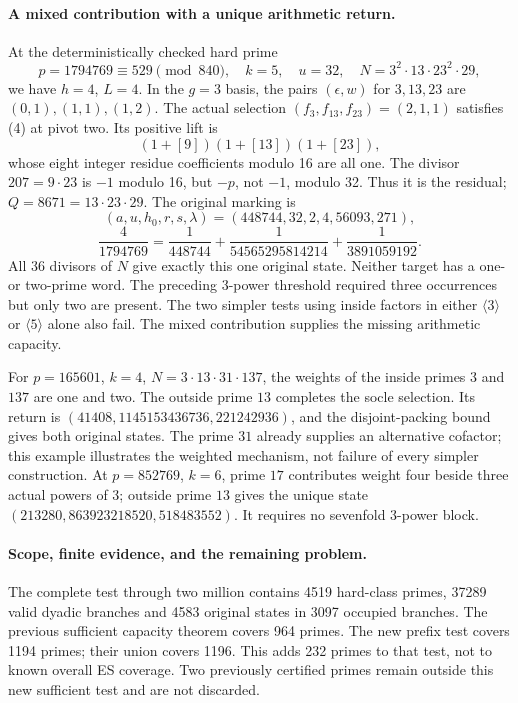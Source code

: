 \documentclass[10pt,a4paper]{article}
\begin{document}
\paragraph{A mixed contribution with a unique arithmetic return.}
At the deterministically checked hard prime
\[
 p=1794769\equiv529\pmod{840},\quad k=5,\quad u=32,\quad
 N=3^2\cdot13\cdot23^2\cdot29,
\]
we have $h=4$, $L=4$. In the $g=3$ basis, the pairs $(\epsilon,w)$ for
$3,13,23$ are $(0,1),(1,1),(1,2)$. The actual selection
$(f_3,f_{13},f_{23})=(2,1,1)$ satisfies (4) at pivot two. Its positive lift is
\[
 (1+[9])(1+[13])(1+[23]),
\]
whose eight integer residue coefficients modulo 16 are all one.
The divisor $207=9\cdot23$ is $-1$ modulo 16, but $-p$, not $-1$, modulo
32. Thus it is the residual; $Q=8671=13\cdot23\cdot29$.
The original marking is
\[
 (a,u,h_0,r,s,\lambda)=(448744,32,2,4,56093,271),
\]
\[
 \boxed{\frac4{1794769}=\frac1{448744}
 +\frac1{54565295814214}+\frac1{3891059192}.}
\]
All 36 divisors of $N$ give exactly this one original state. Neither target
has a one- or two-prime word. The preceding $3$-power threshold required
three occurrences but only two are present. The two simpler tests using
inside factors in either $\langle3\rangle$ or $\langle5\rangle$ alone also
fail. The mixed contribution supplies the missing arithmetic capacity.

For $p=165601$, $k=4$, $N=3\cdot13\cdot31\cdot137$, the weights of the
inside primes $3$ and $137$ are one and two. The outside prime $13$ completes
the socle selection. Its return is
$(41408,1145153436736,221242936)$, and the disjoint-packing bound gives
both original states. The prime $31$ already supplies an alternative cofactor;
this example illustrates the weighted mechanism, not failure of every simpler
construction. At $p=852769$, $k=6$, prime $17$ contributes weight four beside
three actual powers of $3$; outside prime $13$ gives the unique state
$(213280,863923218520,518483552)$. It requires no sevenfold $3$-power block.

\paragraph{Scope, finite evidence, and the remaining problem.}
The complete test through two million contains 4519 hard-class primes,
37289 valid dyadic branches and 4583 original states in 3097 occupied branches.
The previous sufficient capacity theorem covers 964 primes. The new prefix
test covers 1194 primes; their union covers 1196. This adds 232 primes to
that test, not to known overall ES coverage. Two previously certified primes
remain outside this new sufficient test and are not discarded.
\end{document}
